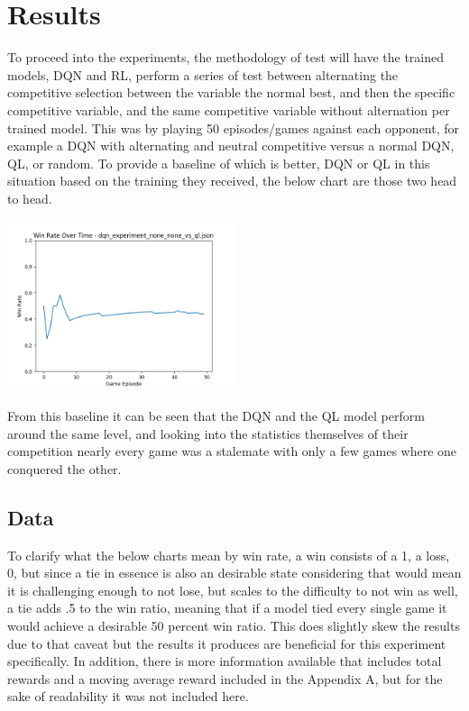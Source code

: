 \section{Results}
\label{sec:results}

To proceed into the experiments, the methodology of test will have the trained models, DQN and RL, perform a series of test between alternating the competitive selection between the variable the normal best, and then the specific competitive variable, and the same
competitive variable without alternation per trained model. This was by playing 50 episodes/games against each opponent, for example a DQN with alternating and neutral competitive versus a normal DQN, QL, or random. To provide a baseline of which is better, DQN or 
QL in this situation based on the training they received, the below chart are those two head to head.

\includegraphics[width=0.5\textwidth]{images/win_rate_dqn_experiment_none_none_vs_ql.png}

From this baseline it can be seen that the DQN and the QL model perform around the same level, and looking into the statistics themselves of their competition nearly every game was a stalemate with only a few games where one conquered the other. 

\subsection{Data}

To clarify what the below charts mean by win rate, a win consists of a 1, a loss, 0, but since a tie in essence is also an desirable state considering that would mean it is challenging enough to not lose, but scales to the difficulty to not win as well, a tie
adds .5 to the win ratio, meaning that if a model tied every single game it would achieve a desirable 50 percent win ratio. This does slightly skew the results due to that caveat but the results it produces are beneficial for this experiment specifically. 
In addition, there is more information available that includes total rewards and a moving average reward included in the Appendix A, but for the sake of readability it was not included here.

